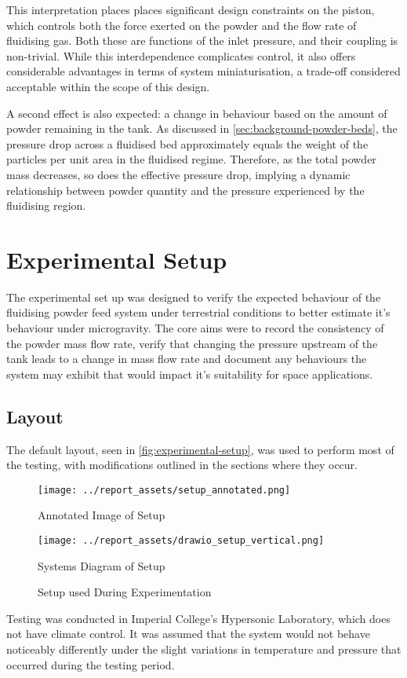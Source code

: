 This interpretation places places significant design constraints on the piston, which controls both the force exerted on the powder and the flow rate of fluidising gas. Both these are functions of the inlet pressure, and their coupling is non-trivial. While this interdependence complicates control, it also offers considerable advantages in terms of system miniaturisation, a trade-off considered acceptable within the scope of this design.

A second effect is also expected: a change in behaviour based on the amount of powder remaining in the tank. As discussed in \autoref{sec:background-powder-beds}, the pressure drop across a fluidised bed approximately equals the weight of the particles per unit area in the fluidised regime. Therefore, as the total powder mass decreases, so does the effective pressure drop, implying a dynamic relationship between powder quantity and the pressure experienced by the fluidising region.

\section{Experimental Setup}
The experimental set up was designed to verify the expected behaviour of the fluidising powder feed system under terrestrial conditions to better estimate it's behaviour under microgravity. The core aims were to record the consistency of the powder mass flow rate, verify that changing the pressure upstream of the tank leads to a change in mass flow rate and document any behaviours the system may exhibit that would impact it's suitability for space applications.

\subsection{Layout}
The default layout, seen in \autoref{fig:experimental-setup}, was used to perform most of the testing, with modifications outlined in the sections where they occur. 
\begin{figure}[htbp]
    \centering

    \begin{minipage}{0.6\textwidth}
        \centering
        \texttt{[image: ../report\_assets/setup\_annotated.png]}
        \caption*{Annotated Image of Setup}
    \end{minipage}
    \hfill
    \begin{minipage}{0.3\textwidth}
        \centering
        \texttt{[image: ../report\_assets/drawio\_setup\_vertical.png]}
        \caption*{Systems Diagram of Setup}
    \end{minipage}
    \caption{Setup used During Experimentation}\label{fig:experimental-setup}
\end{figure}
Testing was conducted in Imperial College's Hypersonic Laboratory, which does not have climate control. It was assumed that the system would not behave noticeably differently under the slight variations in temperature and pressure that occurred during the testing period.

